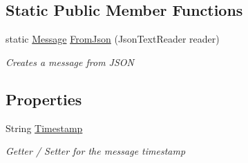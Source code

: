 \subsection*{Static Public Member Functions}
\begin{DoxyCompactItemize}
\item 
static \hyperlink{class_web_analyzer_1_1_models_1_1_message_model_1_1_message}{Message} \hyperlink{class_web_analyzer_1_1_models_1_1_message_model_1_1_message_addad192b40719813b8b260cbea4b6a39}{From\+Json} (Json\+Text\+Reader reader)
\begin{DoxyCompactList}\small\item\em Creates a message from J\+S\+O\+N \end{DoxyCompactList}\end{DoxyCompactItemize}
\subsection*{Properties}
\begin{DoxyCompactItemize}
\item 
String \hyperlink{class_web_analyzer_1_1_models_1_1_message_model_1_1_message_a9054d90256bf9ad8de33d975d2a188d3}{Timestamp}
\begin{DoxyCompactList}\small\item\em Getter / Setter for the message timestamp \end{DoxyCompactList}\end{DoxyCompactItemize}
